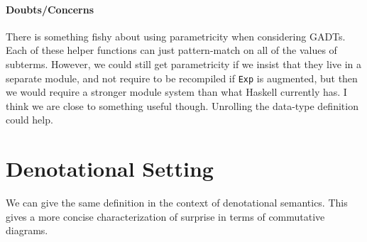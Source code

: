 \documentclass[12pt]{article}
\begin{document}
\paragraph{Doubts/Concerns} There is something fishy about using parametricity when
considering GADTs. Each of these helper functions can just pattern-match on
all of the values of subterms. However, we could still get parametricity if we
insist that they live in a separate module, and not require to be recompiled if
\texttt{Exp} is augmented, but then we would require a stronger module system
than what Haskell currently has. I think we are close to something useful
though. Unrolling the data-type definition could help.



\section{Denotational Setting}
We can give the same definition in the context of denotational semantics. This
gives a more concise characterization of surprise in terms of commutative
diagrams.

\end{document}
